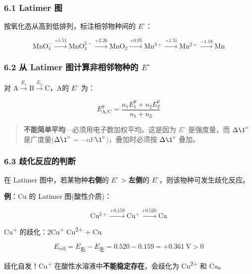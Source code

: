 \subsubsection{6.1 Latimer 图}\label{latimer-ux56fe}

按氧化态从高到低排列，标注相邻物种间的 \(E^{\circ}\)：

\[
\mathrm{MnO_4^-} \xrightarrow{+1.51} \mathrm{MnO_4^{2-}} \xrightarrow{+2.26} \mathrm{MnO_2} \xrightarrow{+0.95} \mathrm{Mn^{3+}} \xrightarrow{+1.51} \mathrm{Mn^{2+}} \xrightarrow{-1.18} \mathrm{Mn}
\]

\subsubsection{\texorpdfstring{6.2 从 Latimer 图计算非相邻物种的 \(E^{\circ}\)}{6.2 从 Latimer 图计算非相邻物种的 E\^{}\{\textbackslash circ\}}}\label{ux4ece-latimer-ux56feux8ba1ux7b97ux975eux76f8ux90bbux7269ux79cdux7684-ecirc}

对 \(\mathrm{A} \xrightarrow{E_1} \mathrm{B} \xrightarrow{E_2} \mathrm{C}\)，A 的 \(E^{\circ}\) 为：

\[
E^\theta_{\mathrm{A/C}} = \frac{n_1 E_1^\theta + n_2 E_2^\theta}{n_1 + n_2}
\]

\begin{quote}
\textbf{不能简单平均}---必须用电子数加权平均。这是因为 \(E^{\circ}\) 是强度量，而 \(\Delta \1^{\circ}\) 是广度量(\(\Delta \1^{\circ}\) = −nF\(\1^{\circ}\))，叠加时必须按 \(\Delta \1^{\circ}\) 叠加。
\end{quote}

\subsubsection{6.3 歧化反应的判断}\label{ux6b67ux5316ux53cdux5e94ux7684ux5224ux65ad}

在 Latimer 图中，若某物种\textbf{右侧}的 \(E^{\circ}\) \textgreater{} \textbf{左侧}的 \(E^{\circ}\)，则该物种可发生歧化反应。

\textbf{例}：Cu 的 Latimer 图(酸性介质)：

\[\mathrm{Cu^{2+}} \xrightarrow{+0.159} \mathrm{Cu^+} \xrightarrow{+0.520} \mathrm{Cu}\]

Cu\textsuperscript{+} 的歧化：2Cu\textsuperscript{+} \箭 Cu\textsuperscript{2+} + Cu

\[E_{\text{cell}} = E_{\text{右}} - E_{\text{左}} = 0.520 - 0.159 = +0.361\ \mathrm{V} > 0\]

歧化自发！Cu\textsuperscript{+} 在酸性水溶液中\textbf{不能稳定存在}，会歧化为 Cu\textsuperscript{2+} 和 Cu。

